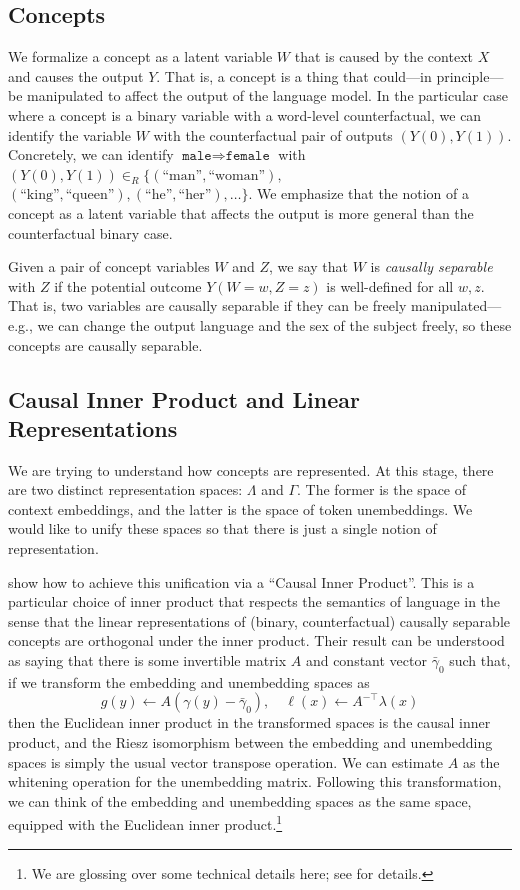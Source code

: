 \documentclass{article}
\newcommand{\ConceptDirName}[2]{\texttt{#1}\Rightarrow\texttt{#2}}
\begin{document}
\subsection{Concepts}
We formalize a concept as a latent variable $W$ that is caused by the context $X$ and causes the output $Y$. 
That is, a concept is a thing that could---in principle---be manipulated to affect the output of the language model.
In the particular case where a concept is a binary variable with a word-level counterfactual, we can identify the variable $W$ with the counterfactual pair of outputs $(Y(0), Y(1))$. Concretely, we can identify $\ConceptDirName{male}{female}$ with $(Y(0), Y(1)) \in_R \{(\text{``man''}, \text{``woman''}),$ $(\text{``king''}, \text{``queen''}), (\text{``he''}, \text{``her''}), \dots\}$. We emphasize that the notion of a concept as a latent variable that affects the output is more general than the counterfactual binary case.

Given a pair of concept variables $W$ and $Z$, we say that $W$ is \emph{causally separable} with $Z$ if the potential outcome $Y(W=w, Z=z)$ is well-defined for all $w,z$.
That is, two variables are causally separable if they can be freely manipulated---e.g., we can change the output language and the sex of the subject freely, so these concepts are causally separable.

\subsection{Causal Inner Product and Linear Representations}
We are trying to understand how concepts are represented.
At this stage, there are two distinct representation spaces: $\Lambda$ and $\Gamma$. The former is the space of context embeddings, and the latter is the space of token unembeddings. 
We would like to unify these spaces so that there is just a single notion of representation. 

 show how to achieve this unification via a ``Causal Inner Product''. This is a particular choice of inner product that respects the semantics of language in the sense that the linear representations of (binary, counterfactual) causally separable concepts are orthogonal under the inner product. Their result can be understood as saying that there is some invertible matrix $A$ and constant vector $\bar{\gamma}_0$ such that, if we transform the embedding and unembedding spaces as
\begin{equation}\label{eq:transformation}
  g(y) \leftarrow A (\gamma(y) - \bar{\gamma}_0), \quad \ell(x) \leftarrow A^{-\top} \lambda(x)
\end{equation}
then the Euclidean inner product in the transformed spaces is the causal inner product, and the Riesz isomorphism between the embedding and unembedding spaces is simply the usual vector transpose operation.
We can estimate $A$ as the whitening operation for the unembedding matrix.
Following this transformation, we can think of the embedding and unembedding spaces as the same space, equipped with the Euclidean inner product.\footnote{We are glossing over some technical details here; see \citet{park2024linear} for details.}
\end{document}
